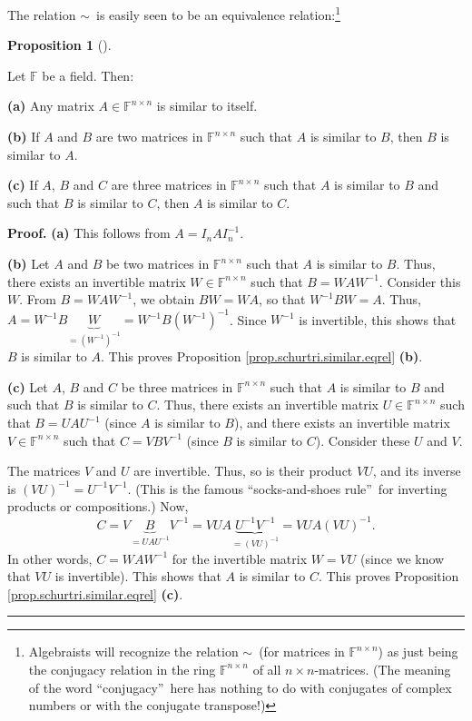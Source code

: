 \documentclass[numbers=enddot,12pt,final,onecolumn,notitlepage]{scrartcl}%
\numberwithin{exer}{subsection}
\theoremstyle{definition}
\newtheorem{prop}[theo]{Proposition}
\newenvironment{proposition}[1][]
{\begin{prop}[#1]\begin{leftbar}}
{\end{leftbar}\end{prop}}
\newenvironment{proof}[1][Proof]{\noindent\textbf{#1.} }{\ \rule{0.5em}{0.5em}}
\begin{document}
The relation $\sim$\ is easily seen to be an equivalence
relation:\footnote{Algebraists will recognize the relation $\sim$\ (for
matrices in $\mathbb{F}^{n\times n}$) as just being the conjugacy relation in
the ring $\mathbb{F}^{n\times n}$ of all $n\times n$-matrices. (The meaning of
the word \textquotedblleft conjugacy\textquotedblright\ here has nothing to do
with conjugates of complex numbers or with the conjugate transpose!)}

\begin{proposition}
\label{prop.schurtri.similar.eqrel}Let $\mathbb{F}$ be a field. Then: \medskip

\textbf{(a)} Any matrix $A\in\mathbb{F}^{n\times n}$ is similar to itself.
\medskip

\textbf{(b)} If $A$ and $B$ are two matrices in $\mathbb{F}^{n\times n}$ such
that $A$ is similar to $B$, then $B$ is similar to $A$. \medskip

\textbf{(c)} If $A$, $B$ and $C$ are three matrices in $\mathbb{F}^{n\times
n}$ such that $A$ is similar to $B$ and such that $B$ is similar to $C$, then
$A$ is similar to $C$.
\end{proposition}

\begin{proof}
\textbf{(a)} This follows from $A=I_{n}AI_{n}^{-1}$. \medskip

\textbf{(b)} Let $A$ and $B$ be two matrices in $\mathbb{F}^{n\times n}$ such
that $A$ is similar to $B$. Thus, there exists an invertible matrix
$W\in\mathbb{F}^{n\times n}$ such that $B=WAW^{-1}$. Consider this $W$. From
$B=WAW^{-1}$, we obtain $BW=WA$, so that $W^{-1}BW=A$. Thus, $A=W^{-1}%
B\underbrace{W}_{=\left(  W^{-1}\right)  ^{-1}}=W^{-1}B\left(  W^{-1}\right)
^{-1}$. Since $W^{-1}$ is invertible, this shows that $B$ is similar to $A$.
This proves Proposition \ref{prop.schurtri.similar.eqrel} \textbf{(b)}.
\medskip

\textbf{(c)} Let $A$, $B$ and $C$ be three matrices in $\mathbb{F}^{n\times
n}$ such that $A$ is similar to $B$ and such that $B$ is similar to $C$. Thus,
there exists an invertible matrix $U\in\mathbb{F}^{n\times n}$ such that
$B=UAU^{-1}$ (since $A$ is similar to $B$), and there exists an invertible
matrix $V\in\mathbb{F}^{n\times n}$ such that $C=VBV^{-1}$ (since $B$ is
similar to $C$). Consider these $U$ and $V$.

The matrices $V$ and $U$ are invertible. Thus, so is their product $VU$, and
its inverse is $\left(  VU\right)  ^{-1}=U^{-1}V^{-1}$. (This is the famous
\textquotedblleft socks-and-shoes rule\textquotedblright\ for inverting
products or compositions.) Now,%
\[
C=V\underbrace{B}_{=UAU^{-1}}V^{-1}=VUA\underbrace{U^{-1}V^{-1}}_{=\left(
VU\right)  ^{-1}}=VUA\left(  VU\right)  ^{-1}.
\]
In other words, $C=WAW^{-1}$ for the invertible matrix $W=VU$ (since we know
that $VU$ is invertible). This shows that $A$ is similar to $C$. This proves
Proposition \ref{prop.schurtri.similar.eqrel} \textbf{(c)}.
\end{proof}
\end{document}
